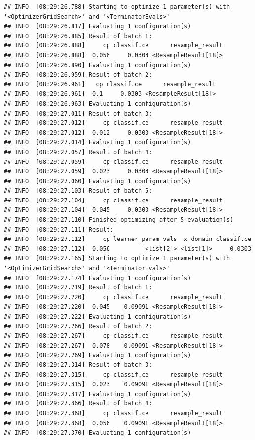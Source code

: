 \documentclass[]{scrbook}
\begin{document}
\begin{verbatim}
## INFO  [08:29:26.788] Starting to optimize 1 parameter(s) with '<OptimizerGridSearch>' and '<TerminatorEvals>' 
## INFO  [08:29:26.817] Evaluating 1 configuration(s) 
## INFO  [08:29:26.885] Result of batch 1: 
## INFO  [08:29:26.888]     cp classif.ce      resample_result 
## INFO  [08:29:26.888]  0.056     0.0303 <ResampleResult[18]> 
## INFO  [08:29:26.890] Evaluating 1 configuration(s) 
## INFO  [08:29:26.959] Result of batch 2: 
## INFO  [08:29:26.961]   cp classif.ce      resample_result 
## INFO  [08:29:26.961]  0.1     0.0303 <ResampleResult[18]> 
## INFO  [08:29:26.963] Evaluating 1 configuration(s) 
## INFO  [08:29:27.011] Result of batch 3: 
## INFO  [08:29:27.012]     cp classif.ce      resample_result 
## INFO  [08:29:27.012]  0.012     0.0303 <ResampleResult[18]> 
## INFO  [08:29:27.014] Evaluating 1 configuration(s) 
## INFO  [08:29:27.057] Result of batch 4: 
## INFO  [08:29:27.059]     cp classif.ce      resample_result 
## INFO  [08:29:27.059]  0.023     0.0303 <ResampleResult[18]> 
## INFO  [08:29:27.060] Evaluating 1 configuration(s) 
## INFO  [08:29:27.103] Result of batch 5: 
## INFO  [08:29:27.104]     cp classif.ce      resample_result 
## INFO  [08:29:27.104]  0.045     0.0303 <ResampleResult[18]> 
## INFO  [08:29:27.110] Finished optimizing after 5 evaluation(s) 
## INFO  [08:29:27.111] Result: 
## INFO  [08:29:27.112]     cp learner_param_vals  x_domain classif.ce 
## INFO  [08:29:27.112]  0.056          <list[2]> <list[1]>     0.0303 
## INFO  [08:29:27.165] Starting to optimize 1 parameter(s) with '<OptimizerGridSearch>' and '<TerminatorEvals>' 
## INFO  [08:29:27.174] Evaluating 1 configuration(s) 
## INFO  [08:29:27.219] Result of batch 1: 
## INFO  [08:29:27.220]     cp classif.ce      resample_result 
## INFO  [08:29:27.220]  0.045    0.09091 <ResampleResult[18]> 
## INFO  [08:29:27.222] Evaluating 1 configuration(s) 
## INFO  [08:29:27.266] Result of batch 2: 
## INFO  [08:29:27.267]     cp classif.ce      resample_result 
## INFO  [08:29:27.267]  0.078    0.09091 <ResampleResult[18]> 
## INFO  [08:29:27.269] Evaluating 1 configuration(s) 
## INFO  [08:29:27.314] Result of batch 3: 
## INFO  [08:29:27.315]     cp classif.ce      resample_result 
## INFO  [08:29:27.315]  0.023    0.09091 <ResampleResult[18]> 
## INFO  [08:29:27.317] Evaluating 1 configuration(s) 
## INFO  [08:29:27.366] Result of batch 4: 
## INFO  [08:29:27.368]     cp classif.ce      resample_result 
## INFO  [08:29:27.368]  0.056    0.09091 <ResampleResult[18]> 
## INFO  [08:29:27.370] Evaluating 1 configuration(s) 

\end{verbatim}
\end{document}
